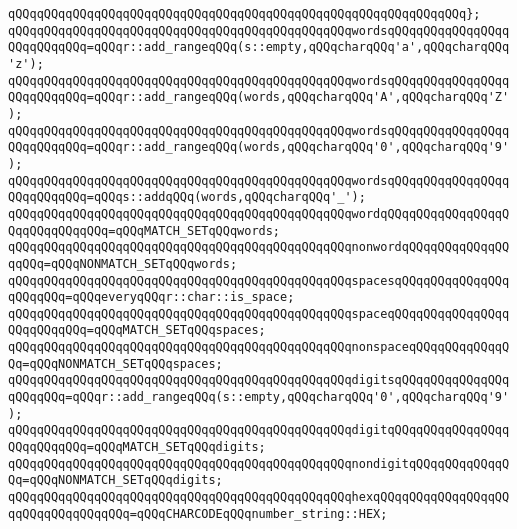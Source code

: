 \verb|qQQqqQQqqQQqqQQqqQQqqQQqqQQqqQQqqQQqqQQqqQQqqQQqqQQqqQQqqQQqqQQq};|\newline
\newline
\newline
\verb|qQQqqQQqqQQqqQQqqQQqqQQqqQQqqQQqqQQqqQQqqQQqqQQqwordsqQQqqQQqqQQqqQQqqQQqqQQqqQQq=qQQqr::add_rangeqQQq(s::empty,qQQqcharqQQq'a',qQQqcharqQQq'z');|\newline
\verb|qQQqqQQqqQQqqQQqqQQqqQQqqQQqqQQqqQQqqQQqqQQqqQQqwordsqQQqqQQqqQQqqQQqqQQqqQQqqQQq=qQQqr::add_rangeqQQq(words,qQQqcharqQQq'A',qQQqcharqQQq'Z');|\newline
\verb|qQQqqQQqqQQqqQQqqQQqqQQqqQQqqQQqqQQqqQQqqQQqqQQqwordsqQQqqQQqqQQqqQQqqQQqqQQqqQQq=qQQqr::add_rangeqQQq(words,qQQqcharqQQq'0',qQQqcharqQQq'9');|\newline
\verb|qQQqqQQqqQQqqQQqqQQqqQQqqQQqqQQqqQQqqQQqqQQqqQQqwordsqQQqqQQqqQQqqQQqqQQqqQQqqQQq=qQQqs::addqQQq(words,qQQqcharqQQq'_');|\newline
\verb|qQQqqQQqqQQqqQQqqQQqqQQqqQQqqQQqqQQqqQQqqQQqqQQqwordqQQqqQQqqQQqqQQqqQQqqQQqqQQqqQQq=qQQqMATCH_SETqQQqwords;|\newline
\verb|qQQqqQQqqQQqqQQqqQQqqQQqqQQqqQQqqQQqqQQqqQQqqQQqnonwordqQQqqQQqqQQqqQQqqQQq=qQQqNONMATCH_SETqQQqwords;|\newline
\newline
\verb|qQQqqQQqqQQqqQQqqQQqqQQqqQQqqQQqqQQqqQQqqQQqqQQqspacesqQQqqQQqqQQqqQQqqQQqqQQq=qQQqeveryqQQqr::char::is_space;|\newline
\verb|qQQqqQQqqQQqqQQqqQQqqQQqqQQqqQQqqQQqqQQqqQQqqQQqspaceqQQqqQQqqQQqqQQqqQQqqQQqqQQq=qQQqMATCH_SETqQQqspaces;|\newline
\verb|qQQqqQQqqQQqqQQqqQQqqQQqqQQqqQQqqQQqqQQqqQQqqQQqnonspaceqQQqqQQqqQQqqQQq=qQQqNONMATCH_SETqQQqspaces;|\newline
\newline
\verb|qQQqqQQqqQQqqQQqqQQqqQQqqQQqqQQqqQQqqQQqqQQqqQQqdigitsqQQqqQQqqQQqqQQqqQQqqQQq=qQQqr::add_rangeqQQq(s::empty,qQQqcharqQQq'0',qQQqcharqQQq'9');|\newline
\verb|qQQqqQQqqQQqqQQqqQQqqQQqqQQqqQQqqQQqqQQqqQQqqQQqdigitqQQqqQQqqQQqqQQqqQQqqQQqqQQq=qQQqMATCH_SETqQQqdigits;|\newline
\verb|qQQqqQQqqQQqqQQqqQQqqQQqqQQqqQQqqQQqqQQqqQQqqQQqnondigitqQQqqQQqqQQqqQQq=qQQqNONMATCH_SETqQQqdigits;|\newline
\newline
\verb|qQQqqQQqqQQqqQQqqQQqqQQqqQQqqQQqqQQqqQQqqQQqqQQqhexqQQqqQQqqQQqqQQqqQQqqQQqqQQqqQQqqQQq=qQQqCHARCODEqQQqnumber_string::HEX;|\newline
